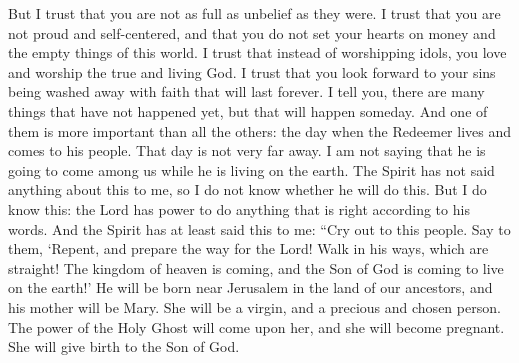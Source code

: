 But I trust that you are not as full as unbelief as they were. I trust that you are not proud and self-centered, and that you do not set your hearts on money and the empty things of this world. I trust that instead of worshipping idols, you love and worship the true and living God. I trust that you look forward to your sins being washed away with faith that will last forever.
\bverse \iffalse For behold, I say unto you there be many things to come; and behold, there is one thing which is of more importance than they all--for behold, the time is not far distant that the Redeemer liveth and cometh among his people. \fi
I tell you, there are many things that have not happened yet, but that will happen someday. And one of them is more important than all the others: the day when the Redeemer lives and comes to his people. That day is not very far away.
\bverse \iffalse Behold, I do not say that he will come among us at the time of his dwelling in his mortal tabernacle; for behold, the Spirit hath not said unto me that this should be the case. Now as to this thing I do not know; but this much I do know, that the Lord God hath power to do all things which are according to his word. \fi
I am not saying that he is going to come among us while he is living on the earth. The Spirit has not said anything about this to me, so I do not know whether he will do this. But I do know this: the Lord has power to do anything that is right according to his words.
\bverse \iffalse But behold, the Spirit hath said this much unto me, saying: Cry unto this people, saying--Repent ye, and prepare the way of the Lord, and walk in his paths, which are straight; for behold, the kingdom of heaven is at hand, and the Son of God cometh upon the face of the earth. \fi
And the Spirit has at least said this to me: ``Cry out to this people. Say to them, \lq Repent, and prepare the way for the Lord! Walk in his ways, which are straight! The kingdom of heaven is coming, and the Son of God is coming to live on the earth!\rq
\bverse \iffalse And behold, he shall be born of Mary, at Jerusalem which is the land of our forefathers, she being a virgin, a precious and chosen vessel, who shall be overshadowed and conceive by the power of the Holy Ghost, and bring forth a son, yea, even the Son of God. \fi
He will be born near Jerusalem in the land of our ancestors, and his mother will be Mary. She will be a virgin, and a precious and chosen person. The power of the Holy Ghost will come upon her, and she will become pregnant. She will give birth to the Son of God.
